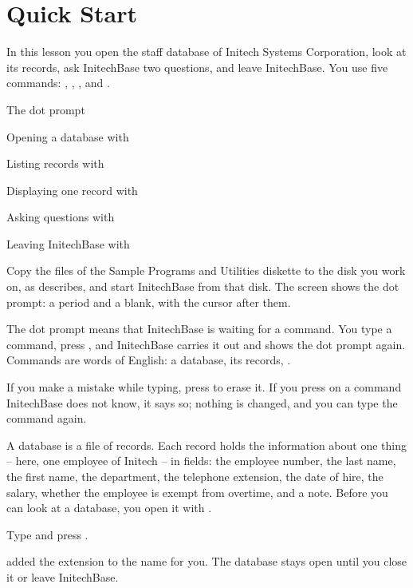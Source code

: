 \chapter{Quick Start}
In this lesson you open the staff database of Initech Systems Corporation,
look at its records, ask InitechBase two questions, and leave InitechBase.
You use five commands: , , ,  and
.

\begin{ChapterCovers}
\item The dot prompt
\item Opening a database with 
\item Listing records with 
\item Displaying one record with 
\item Asking questions with 
\item Leaving InitechBase with 
\end{ChapterCovers}

Copy the files of the Sample Programs and Utilities diskette to the disk you
work on, as  describes, and start InitechBase from
that disk.  The screen shows the dot prompt: a period and a blank, with the
cursor after them.

The dot prompt means that InitechBase is waiting for a command.  You type a
command, press , and InitechBase carries it out and shows the dot
prompt again.  Commands are words of English:  a database,
 its records, .

If you make a mistake while typing, press  to erase it.  If you
press  on a command InitechBase does not know, it says so; nothing
is changed, and you can type the command again.

A database is a file of records.  Each record holds the information about one
thing -- here, one employee of Initech -- in fields: the employee number, the
last name, the first name, the department, the telephone extension, the date
of hire, the salary, whether the employee is exempt from overtime, and a note.
Before you can look at a database, you open it with .
\begin{Steps}
\item Type  and press .
\end{Steps}
 added the extension  to the name for you.  The database
stays open until you close it or leave InitechBase.

